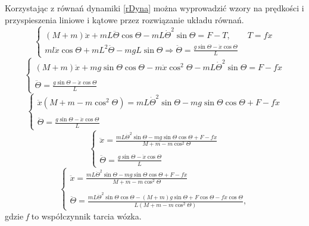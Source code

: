 Korzystając z równań dynamiki \ref{rDyna} można wyprowadzić wzory na prędkości i przyspieszenia liniowe i kątowe przez rozwiązanie układu równań.
\begin{equation}
    \begin{cases}
    (M+m)\ddot{x}+mL\ddot{\Theta}\cos{\Theta}-mL\dot{\Theta}^2\sin{\Theta}=F-T, \qquad T=f\dot{x}\\
    ml\ddot{x}\cos{\Theta}+mL^2\ddot{\Theta}-mgL\sin{\Theta} \Rightarrow \ddot{\Theta}=\frac{g\sin{\Theta}-\ddot{x}\cos{\Theta}}{L}
    \end{cases}
\end{equation}
\newline
\begin{equation}
    \begin{cases}
    (M+m)\ddot{x}+mg\sin{\Theta}\cos{\Theta}-m\ddot{x}\cos^2{\Theta}-mL\dot{\Theta}^2\sin{\Theta}=F-f\dot{x} \\ \\
    \ddot{\Theta}=\frac{g\sin{\Theta}-\ddot{x}\cos{\Theta}}{L}
    \end{cases}
\end{equation}
\newline
\begin{equation}
    \begin{cases}
    \ddot{x}(M+m-m\cos^2{\Theta})=mL\dot{\Theta}^2\sin{\Theta}-mg\sin{\Theta}\cos{\Theta}+F-f\dot{x} \\ \\
    \ddot{\Theta}=\frac{g\sin{\Theta}-\ddot{x}\cos{\Theta}}{L}
    \end{cases}
\end{equation}
\newline
\begin{equation}
    \begin{cases}
    \ddot{x}=\frac{mL\dot{\Theta}^2\sin{\Theta}-mg\sin{\Theta}\cos{\Theta}+F-f\dot{x}}{M+m-m\cos^2{\Theta}} \\ \\ \ddot{\Theta}=\frac{g\sin{\Theta}-\ddot{x}\cos{\Theta}}{L}
    \end{cases}
\end{equation}
\newline
\begin{equation}
    \begin{cases}
    \ddot{x}=\frac{mL\dot{\Theta}^2\sin{\Theta}-mg\sin{\Theta}\cos{\Theta}+F-f\dot{x}}{M+m-m\cos^2{\Theta}} \\ \\
    \ddot{\Theta}=\frac{mL\dot{\Theta}^2\sin{\Theta}\cos{\Theta}-(M+m)g\sin{\Theta}+F\cos{\Theta}-f\dot{x}\cos{\Theta}}{L(M+m-m\cos^2{\Theta})},
    \end{cases}
    \label{rowRuch}
\end{equation}
gdzie \textit{f} to współczynnik tarcia wózka.

